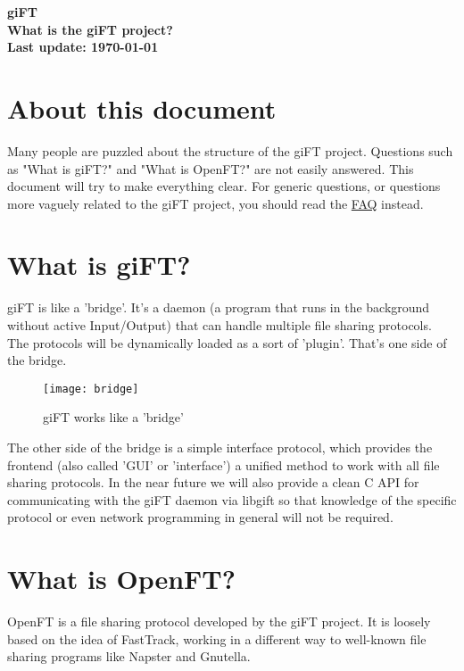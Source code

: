 \documentclass[10pt]{article}
\begin{document}
\begin{center}
\textsf{\textbf{\Huge{giFT}\\ \huge{What is the giFT project?}\\
\normalsize{Last update: \today}}}
\end{center}

\tableofcontents

\setlength{\parskip}{1.4ex}

\section{About this document}
Many people are puzzled about the structure of the giFT project. Questions
such as "What is giFT?" and "What is OpenFT?" are not easily answered. This
document will try to make everything clear. For generic questions, or questions
more vaguely related to the giFT project, you should read the
\href{http://gift.sourceforge.net/docs/?document=faq.html}{FAQ} instead.

\section{What is giFT?}
giFT is like a 'bridge'. It's a daemon (a program that runs in the background
without active Input/Output) that can handle multiple file sharing protocols.
The protocols will be dynamically loaded as a sort of 'plugin'.  That's one
side of the bridge.

\begin{figure}[bh]
  \begin{center}
    \texttt{[image: bridge]}
  \end{center}
  \caption{giFT works like a 'bridge'}
\end{figure}

The other side of the bridge is a simple interface protocol, which provides the
frontend (also called 'GUI' or 'interface') a unified method to work with all
file sharing protocols.  In the near future we will also provide a clean C API
for communicating with the giFT daemon via libgift so that knowledge of the
specific protocol or even network programming in general will not be required.

\section{What is OpenFT?}
OpenFT is a file sharing protocol developed by the giFT project. It is loosely
based on the idea of FastTrack, working in a different way to well-known file
sharing programs like Napster and Gnutella.
\end{document}
